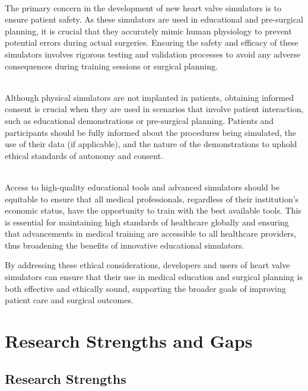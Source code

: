 \\
The primary concern in the development of new heart valve simulators is to ensure patient safety. As these simulators are used in educational and pre-surgical planning, it is crucial that they accurately mimic human physiology to prevent potential errors during actual surgeries. Ensuring the safety and efficacy of these simulators involves rigorous testing and validation processes to avoid any adverse consequences during training sessions or surgical planning.~

\\
Although physical simulators are not implanted in patients, obtaining informed consent is crucial when they are used in scenarios that involve patient interaction, such as educational demonstrations or pre-surgical planning. Patients and participants should be fully informed about the procedures being simulated, the use of their data (if applicable), and the nature of the demonstrations to uphold ethical standards of autonomy and consent.~

\\
Access to high-quality educational tools and advanced simulators should be equitable to ensure that all medical professionals, regardless of their institution's economic status, have the opportunity to train with the best available tools. This is essential for maintaining high standards of healthcare globally and ensuring that advancements in medical training are accessible to all healthcare providers, thus broadening the benefits of innovative educational simulators.~

By addressing these ethical considerations, developers and users of heart valve simulators can ensure that their use in medical education and surgical planning is both effective and ethically sound, supporting the broader goals of improving patient care and surgical outcomes.

\section{Research Strengths and Gaps}

\subsection{Research Strengths}


